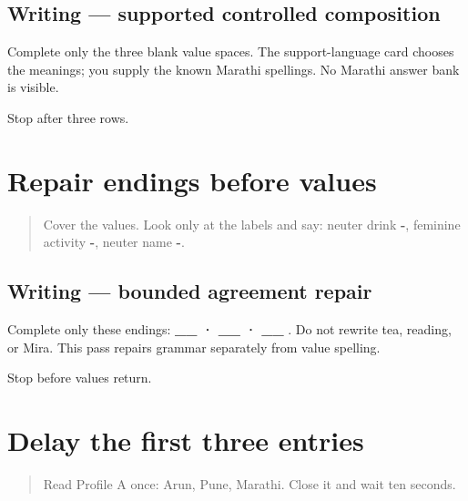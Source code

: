 \subsection*{Writing — supported controlled composition}
Complete only the three blank value spaces. The support-language card chooses the meanings; you supply the known Marathi spellings. No Marathi answer bank is visible.

\begin{tcolorbox}[breakable,colback=teal!4,colframe=teal!35!black,title={Before you move on}]
Stop after three rows.
\end{tcolorbox}
\section[-\mr{ते} · -\mr{ती} · -\mr{चे}]{Repair endings before values}

\label{lesson:MR-A1F09-last-three-agreement}



\begin{quote}
Cover the values. Look only at the labels and say: neuter drink \textbf{-}, feminine activity \textbf{-}, neuter name \textbf{-}.
\end{quote}

\subsection*{Writing — bounded agreement repair}
Complete only these endings: \textbf{\_\_  · \_\_  · \_\_ }. Do not rewrite tea, reading, or Mira. This pass repairs grammar separately from value spelling.

\begin{tcolorbox}[breakable,colback=teal!4,colframe=teal!35!black,title={Before you move on}]
Stop before values return.
\end{tcolorbox}
\section[\mr{नाव}: \mr{अरुण} · \mr{शहर}: \mr{पुणे} · \mr{भाषा}: \mr{मराठी}]{Delay the first three entries}

\label{lesson:MR-A1F10-first-three-delayed}



\begin{quote}
Read Profile A once: Arun, Pune, Marathi. Close it and wait ten seconds.
\end{quote}

